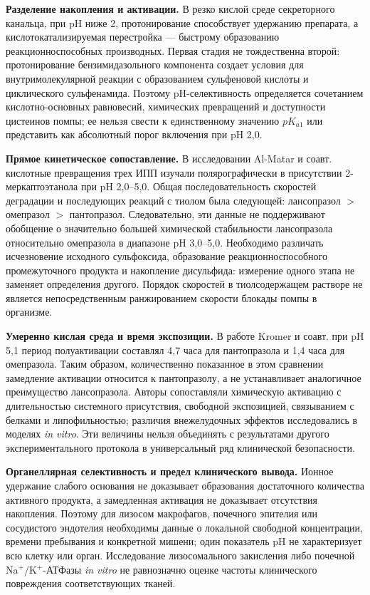 \documentclass[11pt,a4paper,notitlepage]{report}
\newcommand{\src}[1]{\unskip\space\cite{#1}}
\begin{document}
\textbf{Разделение накопления и активации.} В резко кислой среде секреторного канальца, при pH ниже 2, протонирование способствует удержанию препарата, а кислотокатализируемая перестройка --- быстрому образованию реакционноспособных производных. Первая стадия не тождественна второй: протонирование бензимидазольного компонента создает условия для внутримолекулярной реакции с образованием сульфеновой кислоты и циклического сульфенамида. Поэтому pH-селективность определяется сочетанием кислотно-основных равновесий, химических превращений и доступности цистеинов помпы; ее нельзя свести к единственному значению $pK_{a1}$ или представить как абсолютный порог включения при pH 2,0.\src{molchem}

\textbf{Прямое кинетическое сопоставление.} В исследовании Al-Matar и соавт. кислотные превращения трех ИПП изучали полярографически в присутствии 2-меркаптоэтанола при pH 2,0--5,0. Общая последовательность скоростей деградации и последующих реакций с тиолом была следующей: лансопразол $>$ омепразол $>$ пантопразол. Следовательно, эти данные не поддерживают обобщение о значительно большей химической стабильности лансопразола относительно омепразола в диапазоне pH 3,0--5,0. Необходимо различать исчезновение исходного сульфоксида, образование реакционноспособного промежуточного продукта и накопление дисульфида: измерение одного этапа не заменяет определения другого. Порядок скоростей в тиолсодержащем растворе не является непосредственным ранжированием скорости блокады помпы в организме.\src{molkinetics}

\textbf{Умеренно кислая среда и время экспозиции.} В работе Kromer и соавт. при pH 5,1 период полуактивации составлял 4,7 часа для пантопразола и 1,4 часа для омепразола. Таким образом, количественно показанное в этом сравнении замедление активации относится к пантопразолу, а не устанавливает аналогичное преимущество лансопразола. Авторы сопоставляли химическую активацию с длительностью системного присутствия, свободной экспозицией, связыванием с белками и липофильностью; различия внежелудочных эффектов исследовались в моделях \textit{in vitro}. Эти величины нельзя объединять с результатами другого экспериментального протокола в универсальный ряд клинической безопасности.\src{molphselect1998}

\textbf{Органеллярная селективность и предел клинического вывода.} Ионное удержание слабого основания не доказывает образования достаточного количества активного продукта, а замедленная активация не доказывает отсутствия накопления. Поэтому для лизосом макрофагов, почечного эпителия или сосудистого эндотелия необходимы данные о локальной свободной концентрации, времени пребывания и конкретной мишени; один показатель pH не характеризует всю клетку или орган. Исследование лизосомального закисления либо почечной Na$^+$/K$^+$-АТФазы \textit{in vitro} не равнозначно оценке частоты клинического повреждения соответствующих тканей.\src{molphselect1998}
\end{document}
